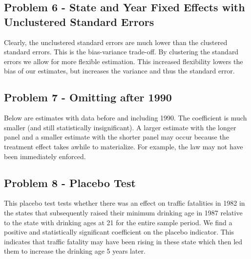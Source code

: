 \documentclass{article}
\begin{document}
\bigskip

\begin{center}

\end{center}

\subsection*{Problem 6 - State and Year Fixed Effects with Unclustered Standard Errors}

Clearly, the unclustered standard errors are much lower than the clustered standard errors.  This is the bias-variance trade-off.  By clustering the standard errors we allow for more flexible estimation.  This increased flexibility lowers the bias of our estimates, but increases the variance and thus the standard error.

\bigskip

\begin{center}

\end{center}

\pagebreak

\subsection*{Problem 7 - Omitting after 1990}

Below are estimates with data before and including 1990.  The coefficient is much smaller (and still statistically insignificant).  A larger estimate with the longer panel and a smaller estimate with the shorter panel may occur because the treatment effect takes awhile to materialize.  For example, the law may not have been immediately enforced.

\begin{center}

\end{center}

\subsection*{Problem 8 - Placebo Test}

This placebo test tests whether there was an effect on traffic fatalities in 1982 in the states that subsequently raised their minimum drinking age in 1987 relative to the state with drinking ages at 21 for the entire sample period.  We find a positive and statistically significant coefficient on the placebo indicator.  This indicates that traffic fatality may have been rising in these state which then led them to increase the drinking age 5 years later.
\end{document}

